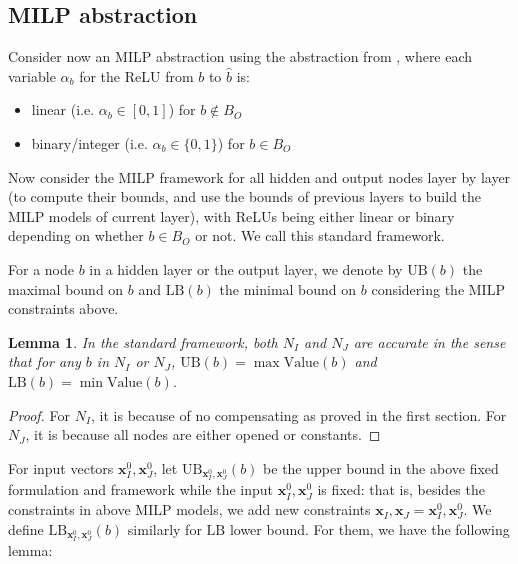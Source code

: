 \documentclass[]{article}
\newtheorem{lemma}{Lemma}
\theoremstyle{definition}
\newtheorem{definition}{Definition}
\newcommand{\Val}{\mathrm{Value}}
\newcommand{\UB}{\mathrm{UB}}
\newcommand{\LB}{\mathrm{LB}}
\newcommand{\B}{\mathrm{B}}
\begin{document}
\subsection{MILP abstraction}

Consider now an MILP abstraction using the abstraction from \cite{MILP}, 
where each variable $\alpha_b$ for the ReLU from $b$ to $\hat{b}$ is:
\begin{itemize}
	\item linear  (i.e. $\alpha_b \in [0,1]$) for $b \notin B_{O}$
	\item binary/integer (i.e. $\alpha_b \in \{0,1\}$) for $b \in B_{O}$
\end{itemize}

Now consider the MILP framework for all hidden and output nodes layer by layer (to compute their bounds, and use the bounds of previous layers to build the MILP models of current layer), with ReLUs being either linear or binary depending on whether $b \in B_{O}$ or not. We call this standard framework.

For a node $b$ in a hidden layer or the output layer, we denote by $\UB(b)$ the maximal bound on $b$ and $\LB(b)$ the minimal bound on $b$ considering the MILP constraints above.


\begin{lemma}
	In the standard framework, both $N_I$ and $N_J$ are accurate in the sense that for any $b$ in $N_I$ or $N_J$, $\UB(b)=\max\Val(b)$ and $\LB(b)=\min\Val(b)$.
\end{lemma}

\begin{proof}
	For $N_I$, it is because of no compensating as proved in the first section. For $N_J$, it is because all nodes are either opened or constants.
\end{proof}


%


For input vectors $\boldsymbol{x}^0_I,\boldsymbol{x}^0_J$, let $\UB_{\boldsymbol{x}^0_I,\boldsymbol{x}^0_J}(b)$ be the upper bound in the above fixed formulation and framework while the input $\boldsymbol{x}^0_I,\boldsymbol{x}^0_J$ is fixed: that is, besides the constraints in above MILP models, we add new constraints $\boldsymbol{x}_I,\boldsymbol{x}_J=\boldsymbol{x}^0_I,\boldsymbol{x}^0_J$. We  define $\LB_{\boldsymbol{x}^0_I,\boldsymbol{x}^0_J}(b)$ similarly for $\LB$ lower bound. For them, we have the following lemma:
\end{document}
